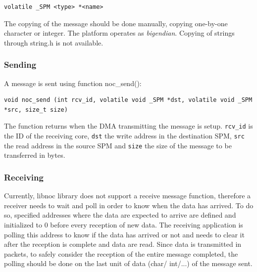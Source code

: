 \documentclass[a4paper,fontsize=10pt,twoside,DIV15,BCOR12mm,headinclude=true,footinclude=false,pagesize,bibtotoc]{scrbook}
\newcommand{\code}[1]{{\texttt{#1}}}
\begin{document}
\begin{lstlisting}
volatile _SPM <type> *<name>
\end{lstlisting}

The copying of the message should be done manually, copying one-by-one character or integer.
The platform operates as \textit{bigendian}.
Copying of strings through string.h is not available. 


\subsubsection{Sending}
A message is sent using function noc\_send():

\begin{lstlisting}
void noc_send (int rcv_id, volatile void _SPM *dst, volatile void _SPM *src, size_t size)
\end{lstlisting}

The function returns when the DMA transmitting the message is setup. \code{rcv\_id}
is the ID of the receiving core, \code{dst} the write address
in the destination SPM, \code{src} the read address
in the source SPM and \code{size} the size of the message to be transferred in bytes.



\subsubsection{Receiving}
Currently, libnoc library does not support a receive message function,
therefore a receiver needs to wait and poll in order to know when the data has arrived.
To do so, specified addresses where the data are expected to arrive are defined and
initialized to 0 before every reception of new data. The receiving application is polling this address to
know if the data has arrived or not and needs to clear it after the reception is complete and data are read.
Since data is transmitted in packets, to safely consider the reception of the entire message
completed, the polling should be done on the last unit of data (char/ int/...) of the message sent.

\end{document}
